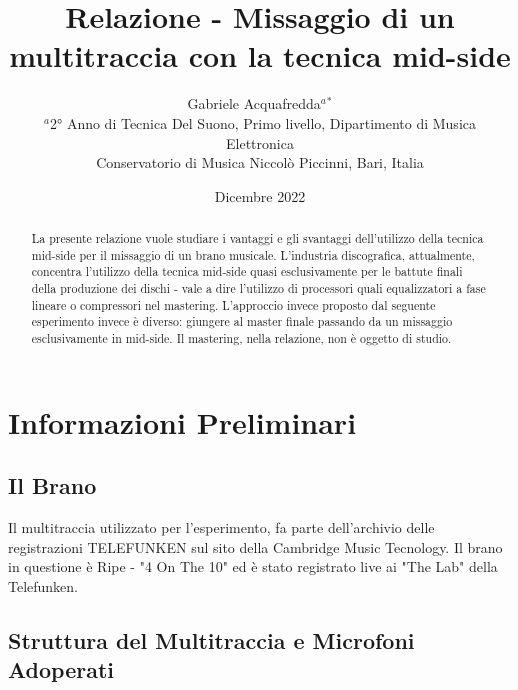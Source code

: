 \documentclass{article}
\title{Relazione - Missaggio di un multitraccia con la tecnica mid-side}
\author{Gabriele Acquafredda$^{a}$$^{*}$ \\
    \small $^{a}$2° Anno di Tecnica Del Suono, Primo livello, Dipartimento di Musica Elettronica\\
    \small  Conservatorio di Musica Niccolò Piccinni, Bari, Italia\\
}
\date{Dicembre 2022}
\begin{document}
\maketitle

\begin{abstract} 
    \noindent La presente relazione vuole studiare i vantaggi e gli svantaggi dell'utilizzo della tecnica mid-side per il missaggio di un brano musicale. L'industria discografica, attualmente, concentra l'utilizzo della tecnica mid-side quasi esclusivamente per le battute finali della produzione dei dischi - vale a dire l'utilizzo di processori quali equalizzatori a fase lineare o compressori nel mastering. L'approccio invece proposto dal seguente esperimento invece è diverso: giungere al master finale passando da un missaggio esclusivamente in mid-side. Il mastering, nella relazione, non è oggetto di studio.
\end{abstract}

\section{Informazioni Preliminari}

\subsection{Il Brano}

Il multitraccia utilizzato per l'esperimento, fa parte dell'archivio delle registrazioni TELEFUNKEN sul sito della Cambridge Music Tecnology. Il brano in questione è Ripe - "4 On The 10" ed è stato registrato live ai "The Lab" della Telefunken.

\subsection{Struttura del Multitraccia e Microfoni Adoperati}
\end{document}

